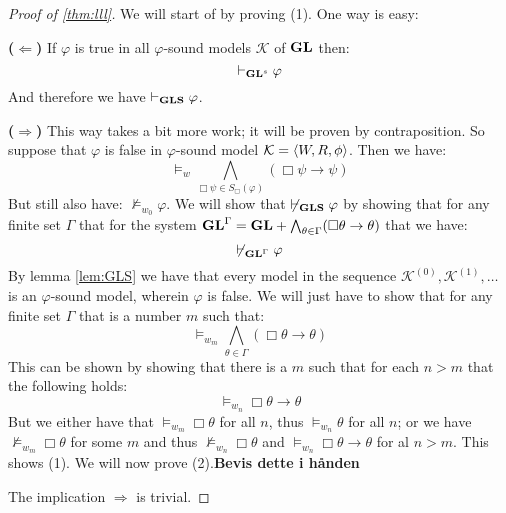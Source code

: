 \documentclass[../main.tex]{subfiles}
\begin{document}
\begin{proof}[Proof of \ref{thm:lll}]
	We will start of by proving (1). One way is easy:

	\textbf{($\Leftarrow$)} If $\varphi$ is true in all $\varphi$-sound
	models $\mathcal{K}$ of $\text{\textbf{GL}}$ then:
	$$\vdash_{\text{\textbf{GL}}^s}\varphi$$
	And therefore we have $\vdash_{\text{\textbf{GLS}}}\varphi$.

	\textbf{($\Rightarrow$)} This way takes a bit more work; it will be
	proven by contraposition. So suppose that $\varphi$ is false in
	$\varphi$-sound model $\mathcal{K}=\langle W,R,\phi\rangle$. Then we have:
	$$\vDash_w\bigwedge_{\Box\psi\in
	S_\Box(\varphi)}(\Box\psi\rightarrow\psi)$$
	But still also have: $\not\vDash_{w_0}\varphi$. We will show that
	$\not\vdash_{\text{\textbf{GLS}}}\varphi$ by showing that for any finite set $\Gamma$
	that for the system
	$\text{\textbf{GL}}^\Gamma=\text{\textbf{GL}}+\bigwedge_{\theta\in\Gamma}(\Box\theta\rightarrow\theta)$
	that we have:
	$$\not\vdash_{\text{\textbf{GL}}^\Gamma}\varphi$$
	By lemma \ref{lem:GLS} we have that every  model in the sequence
	$\mathcal{K}^{(0)},\mathcal{K}^{(1)},\ldots$ is an $\varphi$-sound
	model, wherein $\varphi$ is false. We will just have to show that for
	any finite set $\Gamma$ that is a number $m$ such that:
	$$\vDash_{w_m}\bigwedge_{\theta\in\Gamma}(\Box\theta\rightarrow\theta)$$
	This can be shown by showing that there is a $m$ such that for each
	$n>m$ that the following holds:
	$$\vDash_{w_n}\Box\theta\rightarrow\theta$$
	But we either have that $\vDash_{w_m}\Box\theta$ for all $n$, thus
	$\vDash_{w_n}\theta$ for all $n$; or we have
	$\not\vDash_{w_m}\Box\theta$ for some $m$ and thus
	$\not\vDash_{w_n}\Box\theta$ and
	$\vDash_{w_n}\Box\theta\rightarrow\theta$ for al $n>m$. This shows (1).
	We will now prove (2).\textbf{Bevis dette i hånden}
	
	The implication $\Rightarrow$ is trivial. 
\end{proof}
\end{document}
